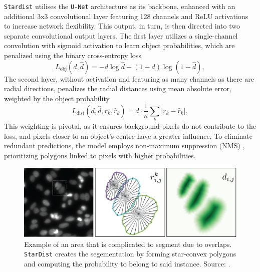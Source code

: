 \texttt{Stardist} utilises the \texttt{U-Net} architecture \cite{RonnebergerFB15} as its backbone, enhanced with an additional 3x3 convolutional layer featuring 128 channels and ReLU activations to increase network flexibility. This output, in turn, is then directed into two separate convolutional output layers. The first layer utilizes a single-channel convolution with sigmoid activation to learn object probabilities, which are penalized using the binary cross-entropy loss
\begin{equation}\label{eqbceloss}
	L_{\text{obj}}(d,\hat{d})=-d\log\hat{d}-(1-d)\log(1-\hat{d}),
\end{equation}
The second layer, without activation and featuring as many channels as there are radial directions, penalizes the radial distances using mean absolute error, weighted by the object probability
\begin{equation}
	L_{\text{dist}}(d,\hat{d},r_k,\hat{r}_k)=d\cdot\frac{1}{n}\sum_k|r_k-\hat{r}_k|,
\end{equation}
This weighting is pivotal, as it ensures background pixels do not contribute to the loss, and pixels closer to an object's centre have a greater influence. To eliminate redundant predictions, the model employs non-maximum suppression (NMS) \cite{hosang2017learning, ren2016faster}, prioritizing polygons linked to pixels with higher probabilities.

\begin{figure}
	\centering
	\includegraphics[width=\textwidth]{"images/star_convexity_explained.png"}
	\caption[\texttt{StarDist} summarized]{Example of an area that is complicated to segment due to overlaps. \texttt{StarDist} creates the segementation by forming star-convex polygons and computing the probability to belong to said instance. Source: \Cite{schmidt2018}.}
	\label{figstardistexplained}
\end{figure}

